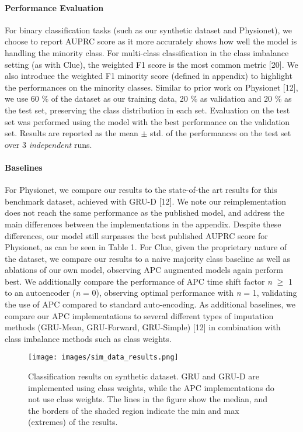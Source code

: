 \documentclass{article}
\begin{document}
\paragraph{Performance Evaluation}
For binary classification tasks (such as our synthetic dataset and Physionet), we choose to report AUPRC score as it more accurately shows how well the model is handling the minority class. 
For multi-class classification in the class imbalance setting (as with Clue), the weighted F1 score 
is the most common metric [20].
We also introduce the weighted F1 minority score (defined in appendix) to highlight the performances on the minority classes. 
Similar to prior work on Physionet [12], we use 60 $\%$ of the dataset as our training data, 20 $\%$ as validation and 20 $\%$ as the test set, preserving the class distribution in each set.
Evaluation on the test set was performed using the model with the best performance on the validation set.
Results are reported as the mean $\pm$ std. of the performances on the test set over 3 \textit{independent} runs.

\paragraph{Baselines}
For Physionet, we compare our results to the state-of-the art results for this benchmark dataset, achieved with GRU-D [12].
We note our reimplementation does not reach the same performance as the published model, and address the main differences between the implementations in the appendix. Despite these differences, our model still surpasses the best published AUPRC score for Physionet, as can be seen in Table 1. For Clue, given the proprietary nature of the dataset, we compare our results to a naive majority class baseline as well as ablations of our own model, observing APC augmented models again perform best.  
We additionally compare the performance of APC time shift factor \textit{n} $\geq$ 1 to an autoencoder (\textit{n} = 0), observing optimal performance with \textit{n} = 1, validating the use of APC compared to standard auto-encoding. As additional baselines, we compare our APC implementations to several different types of imputation methods (GRU-Mean, GRU-Forward, GRU-Simple) [12] in combination with class imbalance methods such as class weights.

\begin{figure}[ht]
\vskip 0.05in
\begin{center}
\centerline{\texttt{[image: images/sim\_data\_results.png]}}
\caption{Classification results on synthetic dataset. GRU and GRU-D are implemented using class weights, while the APC implementations do not use class weights. The lines in the figure show the median, and the borders of the shaded region indicate the min and max (extremes) of the results.} 
\label{APC_sim_data}
\end{center}
\vskip -0.25in
\end{figure}
\end{document}
